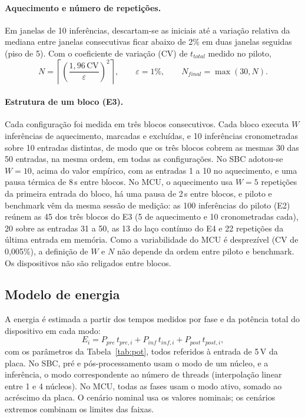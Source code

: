 \documentclass[11pt,a4paper]{article}
\begin{document}
\paragraph{Aquecimento e número de repetições.} Em janelas de 10 inferências, descartam-se as iniciais até a
variação relativa da mediana entre janelas consecutivas ficar abaixo de 2\% em duas janelas seguidas (piso
de 5). Com o coeficiente de variação (CV) de $t_{total}$ medido no piloto,
\begin{equation}
N=\left\lceil\left(\frac{1{,}96\,\mathrm{CV}}{\varepsilon}\right)^{2}\right\rceil,\qquad \varepsilon=1\%,\qquad N_{final}=\max(30,N).
\end{equation}

\paragraph{Estrutura de um bloco (E3).} Cada configuração foi medida em três blocos consecutivos. Cada bloco
executa $W$ inferências de aquecimento, marcadas e excluídas, e 10 inferências cronometradas sobre 10 entradas
distintas, de modo que os três blocos cobrem as mesmas 30 das 50 entradas, na mesma ordem, em todas as
configurações. No SBC adotou-se $W=10$, acima do valor empírico, com as entradas 1 a 10 no aquecimento, e uma pausa
térmica de 8\,s entre blocos. No MCU, o aquecimento usa $W=5$ repetições da primeira entrada do bloco, há uma pausa de 2\,s entre blocos, e
piloto e benchmark vêm da mesma sessão de medição: as 100 inferências do piloto (E2) reúnem as 45 dos três blocos
do E3 (5 de aquecimento e 10 cronometradas cada), 20 sobre as entradas 31 a 50, as 13 do laço contínuo do E4 e 22
repetições da última entrada em memória. Como a variabilidade do MCU é desprezível
(CV de 0,005\%), a definição de $W$ e $N$ não depende da ordem entre piloto e benchmark. Os dispositivos não são religados entre blocos.

\subsection{Modelo de energia}
A energia é estimada a partir dos tempos medidos por fase e da potência total do dispositivo em cada modo:
\begin{equation}
E_i = P_{pre}\,t_{pre,i}+P_{inf}\,t_{inf,i}+P_{post}\,t_{post,i},
\end{equation}
com os parâmetros da Tabela~\ref{tab:pot}, todos referidos à entrada de 5\,V da placa. No SBC, pré e
pós-processamento usam o modo de um núcleo, e a inferência, o modo correspondente ao número de threads
(interpolação linear entre 1 e 4 núcleos). No MCU, todas as fases usam o modo ativo, somado ao acréscimo da placa.
O cenário nominal usa os valores nominais; os cenários extremos combinam os limites das faixas.
\end{document}
